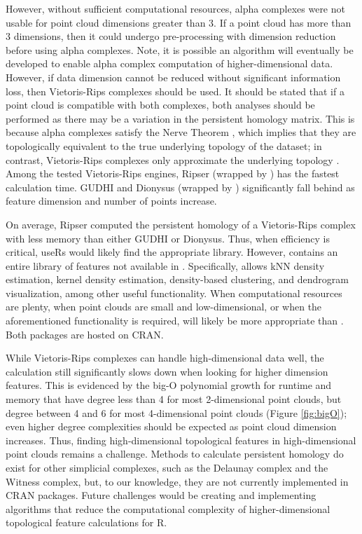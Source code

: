 However, without sufficient computational resources, alpha complexes
were not usable for point cloud dimensions greater than 3. If a point
cloud has more than 3 dimensions, then it could undergo pre-processing
with dimension reduction before using alpha complexes. Note, it is
possible an algorithm will eventually be developed to enable alpha
complex computation of higher-dimensional data. However, if data
dimension cannot be reduced without significant information loss, then
Vietoris-Rips complexes should be used. It should be stated that if a
point cloud is compatible with both complexes, both analyses should be
performed as there may be a variation in the persistent homology matrix.
This is because alpha complexes satisfy the Nerve Theorem
\citep{alpha-complex}, which implies that they are topologically
equivalent to the true underlying topology of the dataset; in contrast,
Vietoris-Rips complexes only approximate the underlying topology
\citep{Rips-Complex}. Among the tested Vietoris-Rips engines, Ripser
(wrapped by ) has the fastest calculation time. GUDHI
and Dionysus (wrapped by ) significantly fall behind as
feature dimension and number of points increase.

On average, Ripser computed the persistent homology of a Vietoris-Rips
complex with less memory than either GUDHI or Dionysus. Thus, when
efficiency is critical, useRs would likely find  the
appropriate library. However,  contains an entire library
of features not available in . Specifically,
 allows kNN density estimation, kernel density estimation,
density-based clustering, and dendrogram visualization, among other
useful functionality. When computational resources are plenty, when
point clouds are small and low-dimensional, or when the aforementioned
functionality is required,  will likely be more appropriate
than . Both packages are hosted on CRAN.

While Vietoris-Rips complexes can handle high-dimensional data well, the calculation still significantly slows down when looking for higher
dimension features. This is evidenced by the big-O polynomial growth for
runtime and memory that have degree less than 4 for most 2-dimensional
point clouds, but degree between 4 and 6 for most 4-dimensional point
clouds (Figure \ref{fig:bigO}); even higher degree complexities should
be expected as point cloud dimension increases. Thus, finding
high-dimensional topological features in high-dimensional point clouds
remains a challenge. Methods to calculate persistent homology do exist
for other simplicial complexes, such as the Delaunay complex and the
Witness complex, but, to our knowledge, they are not currently
implemented in CRAN packages. Future challenges would be creating and
implementing algorithms that reduce the computational complexity of
higher-dimensional topological feature calculations for R.

